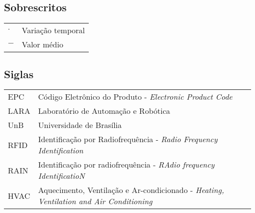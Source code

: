 \subsection*{Sobrescritos}

\begin{tabular}{p{}p{}}
$\cdot$  & Variação temporal \tabularnewline
$-$  & Valor médio \tabularnewline
\end{tabular}


\subsection*{Siglas}

\begin{tabular}{p{}p{}}
EPC  & Código Eletrônico do Produto - \textit{Electronic Product Code}\tabularnewline
LARA & Laboratório de Automação e Robótica \tabularnewline
UnB & Universidade de Brasília \tabularnewline
RFID & Identificação por Radiofrequência - \textit{Radio Frequency Identification}\tabularnewline
RAIN & Identificação por radiofrequência - \textit{RAdio frequency IdentificatioN} \tabularnewline
HVAC & Aquecimento, Ventilação e Ar-condicionado - \textit{Heating, Ventilation and Air Conditioning}\tabularnewline
\end{tabular}
